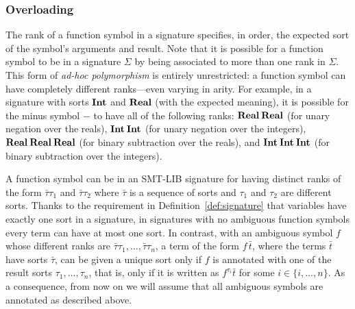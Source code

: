 \subsubsection{Overloading}
The rank of a function symbol in a signature specifies, in order,
the expected sort of the symbol's arguments and result.
Note that it is possible for a function symbol
to be  in a signature $\Sigma$
by being associated to more than one rank in $\Sigma$.
This form of \emph{ad-hoc polymorphism} is entirely unrestricted: 
a function symbol can have completely different ranks---even varying in arity. 
For example,
in a signature with sorts $\textbf{Int}$ and $\textbf{Real}$ (with the expected meaning),
it is possible for the minus symbol $-$ to have all of the following ranks:  
$\textbf{Real}\:\textbf{Real}$ (for unary negation over the reals),
$\textbf{Int}\:\textbf{Int}$ (for unary negation over the integers),
$\textbf{Real}\:\textbf{Real}\:\textbf{Real}$ (for binary subtraction over the reals),
and
$\textbf{Int}\:\textbf{Int}\:\textbf{Int}$ (for binary subtraction over the integers).


A function symbol can be 
in an SMT-LIB signature for having distinct ranks of the form
$\bar{\tau}\tau_1$ and $\bar{\tau}\tau_2$ 
where $\bar{\tau}$ is a sequence of sorts and 
$\tau_1$ and $\tau_2$ are different sorts.
Thanks to the requirement in Definition~\ref{def:signature} that
variables have exactly one sort in a signature,
in signatures with no ambiguous function symbols
every term can have at most one sort.
In contrast,
with an ambiguous symbol $f$ whose different ranks are
$\bar{\tau}\tau_1, \ldots, \bar{\tau}\tau_n$,
a term of the form $f\, \bar{t}$,
where the terms $\bar t$ have sorts $\bar \tau$, can be given 
a unique sort only if $f$ is annotated with one of the result sorts
$\tau_1, \ldots, \tau_n$,
that is, only if it is written as $f^{\tau_i}\bar{t}$ 
for some $i \in \{i,\ldots, n\}$.
As a consequence, from now on we will assume 
that all ambiguous symbols are annotated as described above.


